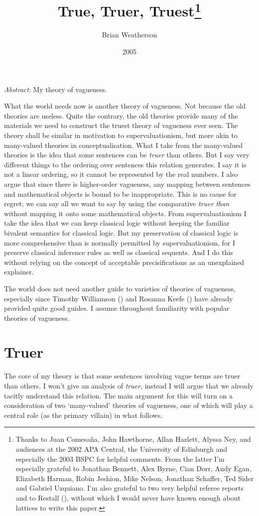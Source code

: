 \documentclass[
  11pt,
  letterpaper,
  DIV=11,
  numbers=noendperiod,
  twoside]{scrartcl}
\title{True, Truer, Truest\thanks{Thanks to Juan Comesaña, John
Hawthorne, Allan Hazlett, Alyssa Ney, and audiences at the 2002 APA
Central, the University of Edinburgh and especially the 2003 BSPC for
helpful comments. From the latter I'm especially grateful to Jonathan
Bennett, Alex Byrne, Cian Dorr, Andy Egan, Elizabeth Harman, Robin
Jeshion, Mike Nelson, Jonathan Schaffer, Ted Sider and Gabriel Uzquiano.
I'm also grateful to two very helpful referee reports and to Restall
(\citeproc{ref-Restall2000}{1999}), without which I would never have
known enough about lattices to write this paper.}}
\author{Brian Weatherson}
\date{2005}
\renewenvironment{abstract}
 {\vspace{-1.25cm}
 \quotation\small\noindent\emph{Abstract}:}
 {\endquotation}
\begin{document}
\maketitle
\begin{abstract}
My theory of vagueness.
\end{abstract}


What the world needs now is another theory of vagueness. Not because the
old theories are useless. Quite the contrary, the old theories provide
many of the materials we need to construct the truest theory of
vagueness ever seen. The theory shall be similar in motivation to
supervaluationism, but more akin to many-valued theories in
conceptualisation. What I take from the many-valued theories is the idea
that some sentences can be \emph{truer} than others. But I say very
different things to the ordering over sentences this relation generates.
I say it is not a linear ordering, so it cannot be represented by the
real numbers. I also argue that since there is higher-order vagueness,
any mapping between sentences and mathematical objects is bound to be
inappropriate. This is no cause for regret; we can say all we want to
say by using the comparative \emph{truer than} without mapping it onto
some mathematical objects. From supervaluationism I take the idea that
we can keep classical logic without keeping the familiar bivalent
semantics for classical logic. But my preservation of classical logic is
more comprehensive than is normally permitted by supervaluationism, for
I preserve classical inference rules as well as classical sequents. And
I do this without relying on the concept of acceptable precisifications
as an unexplained explainer.

The world does not need another guide to varieties of theories of
vagueness, especially since Timothy Williamson
() and Rosanna Keefe
() have already provided quite good
guides. I assume throughout familiarity with popular theories of
vagueness.

\section{Truer}\label{truer}

The core of my theory is that some sentences involving vague terms are
truer than others. I won't give an analysis of \emph{truer}, instead I
will argue that we already tacitly understand this relation. The main
argument for this will turn on a consideration of two `many-valued'
theories of vagueness, one of which will play a central role (as the
primary villain) in what follows.
\end{document}

